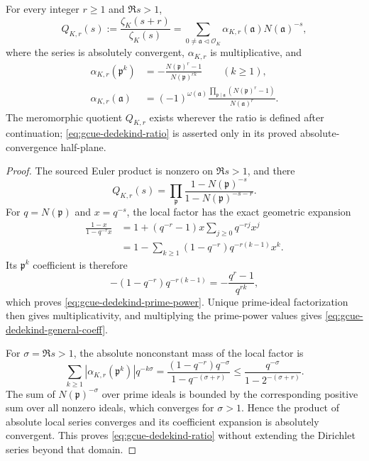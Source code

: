 \begin{theorem}
\label{thm:gcue-dedekind-ratio}
For every integer $r\ge1$ and $\Re s>1$,
\begin{equation}
 Q_{K,r}(s):=\frac{\zeta_K(s+r)}{\zeta_K(s)}
 =\sum_{0\ne\mathfrak a\lhd\mathcal O_K}
 \alpha_{K,r}(\mathfrak a)N(\mathfrak a)^{-s},
 \label{eq:gcue-dedekind-ratio}
\end{equation}
where the series is absolutely convergent, $\alpha_{K,r}$ is multiplicative, and
\begin{align}
 \alpha_{K,r}(\mathfrak p^k)
 &=-\frac{N(\mathfrak p)^r-1}{N(\mathfrak p)^{rk}}
 \qquad(k\ge1),
 \label{eq:gcue-dedekind-prime-power}\\
 \alpha_{K,r}(\mathfrak a)
 &=(-1)^{\omega(\mathfrak a)}
 \frac{\prod_{\mathfrak p\mid\mathfrak a}(N(\mathfrak p)^r-1)}
 {N(\mathfrak a)^r}.
 \label{eq:gcue-dedekind-general-coeff}
\end{align}
The meromorphic quotient $Q_{K,r}$ exists wherever the ratio is defined after continuation;
\eqref{eq:gcue-dedekind-ratio} is asserted only in its proved absolute-convergence
half-plane.
\end{theorem}

\begin{proof}
The sourced Euler product is nonzero on $\Re s>1$, and there
\[
 Q_{K,r}(s)=\prod_{\mathfrak p}
 \frac{1-N(\mathfrak p)^{-s}}{1-N(\mathfrak p)^{-s-r}}.
\]
For $q=N(\mathfrak p)$ and $x=q^{-s}$, the local factor has the exact geometric expansion
\begin{align*}
 \frac{1-x}{1-q^{-r}x}
 &=1+(q^{-r}-1)x\sum_{j\ge0}q^{-rj}x^j\\
 &=1-\sum_{k\ge1}(1-q^{-r})q^{-r(k-1)}x^k.
\end{align*}
Its $\mathfrak p^k$ coefficient is therefore
\[
 -(1-q^{-r})q^{-r(k-1)}=-\frac{q^r-1}{q^{rk}},
\]
which proves \eqref{eq:gcue-dedekind-prime-power}.  Unique prime-ideal factorization then
gives multiplicativity, and multiplying the prime-power values gives
\eqref{eq:gcue-dedekind-general-coeff}.

For $\sigma=\Re s>1$, the absolute nonconstant mass of the local factor is
\[
 \sum_{k\ge1}|\alpha_{K,r}(\mathfrak p^k)|q^{-k\sigma}
 =\frac{(1-q^{-r})q^{-\sigma}}{1-q^{-(\sigma+r)}}
 \le \frac{q^{-\sigma}}{1-2^{-(\sigma+r)}}.
\]
The sum of $N(\mathfrak p)^{-\sigma}$ over prime ideals is bounded by the corresponding
positive sum over all nonzero ideals, which converges for $\sigma>1$.  Hence the product of
absolute local series converges and its coefficient expansion is absolutely convergent.
This proves \eqref{eq:gcue-dedekind-ratio} without extending the Dirichlet series beyond
that domain.
\end{proof}

